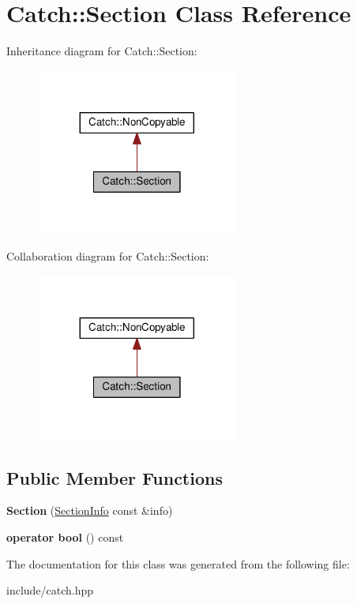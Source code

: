 \hypertarget{classCatch_1_1Section}{}\section{Catch\+:\+:Section Class Reference}
\label{classCatch_1_1Section}


Inheritance diagram for Catch\+:\+:Section\+:\nopagebreak
\begin{figure}[H]
\begin{center}
\leavevmode
\includegraphics[width=188pt]{classCatch_1_1Section__inherit__graph}
\end{center}
\end{figure}


Collaboration diagram for Catch\+:\+:Section\+:\nopagebreak
\begin{figure}[H]
\begin{center}
\leavevmode
\includegraphics[width=188pt]{classCatch_1_1Section__coll__graph}
\end{center}
\end{figure}
\subsection*{Public Member Functions}
\begin{DoxyCompactItemize}
\item 
{\bfseries Section} (\hyperlink{structCatch_1_1SectionInfo}{Section\+Info} const \&info)\hypertarget{classCatch_1_1Section_a68fd4e51e8981aaa7ddb00d8a6abd099}{}\label{classCatch_1_1Section_a68fd4e51e8981aaa7ddb00d8a6abd099}

\item 
{\bfseries operator bool} () const \hypertarget{classCatch_1_1Section_a6c9be48e8ba0611c4aa601102e706f3b}{}\label{classCatch_1_1Section_a6c9be48e8ba0611c4aa601102e706f3b}

\end{DoxyCompactItemize}


The documentation for this class was generated from the following file\+:\begin{DoxyCompactItemize}
\item 
include/catch.\+hpp\end{DoxyCompactItemize}
